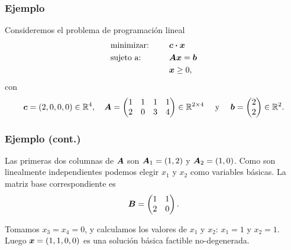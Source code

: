 \documentclass[aspectratio=169,12pt,spanish]{beamer}
\begin{document}

\begin{frame}
\frametitle{Ejemplo}

Consideremos el problema de programación lineal
\begin{alignat*}{2}
  & \text{minimizar: } & & \bm{c} \boldsymbol{\cdot} \bm{x} \\
   & \text{sujeto a: } & \quad & \bm{A}\bm{x} = \bm{b} \\
   & & & \bm{x} \ge 0,
\end{alignat*}
con
$$\bm{c} = (2, 0, 0, 0) \in \mathbb{R}^4, \quad 
\bm{A} = \begin{pmatrix}
1 & 1 & 1 & 1 \\
2 & 0 & 3 & 4
\end{pmatrix} \in \mathbb{R}^{2 \times 4}
\quad \text{ y } \quad \bm{b} = \begin{pmatrix} 2 \\ 2 \end{pmatrix} \in \mathbb{R}^2.
$$


\end{frame}


\begin{frame}
\frametitle{Ejemplo (cont.)}

Las primeras dos columnas de $\bm{A}$ son $\bm{A}_1 = (1,2)$ y $\bm{A}_2 = (1, 0)$. Como son linealmente independientes podemos elegir $x_1$ y $x_2$ como variables básicas. La matriz base correspondiente es
$$
\bm{B} = \begin{pmatrix} 1 & 1 \\ 2 & 0 \end{pmatrix}.
$$

Tomamos $x_3 = x_4 = 0$, y calculamos los valores de $x_1$ y $x_2$: $x_1 = 1$ y $x_2 = 1$. Luego $\bm{x} = (1, 1, 0, 0)$ es una solución básica factible no-degenerada.

\end{frame}

\end{document}
